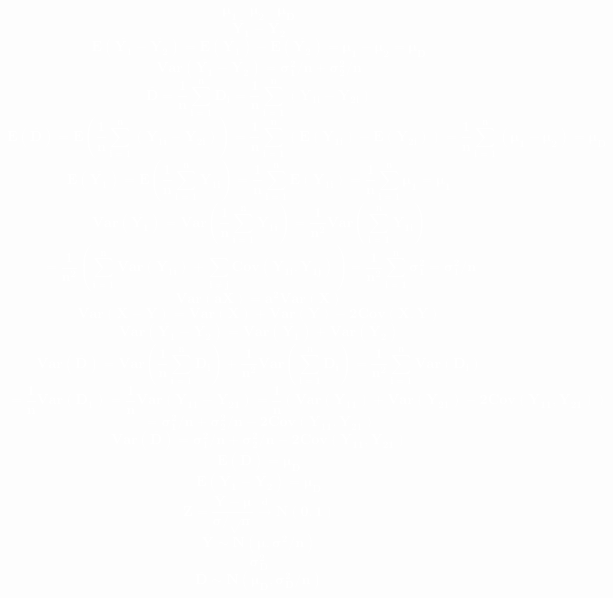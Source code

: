 \documentclass[12pt,portrait,semhelv,semrot]{article}
\begin{document}
\normalsize

\textcolor{white}{\textbf{
$$\boldsymbol{\mu_1~~~~\mu_2~~~~\mu_D}$$
$$\boldsymbol{\bar{Y_1}-\bar{Y_2}}$$
$$\boldsymbol{E\left(\bar{Y_1}-\bar{Y_2}\right)= E\left(\bar{Y_1}\right) - E\left(\bar{Y_2}\right) = \mu_1-\mu_2 = \mu_D}$$
$$\boldsymbol{Var\left(\bar{Y_1}-\bar{Y_2}\right)= \sigma_1^2/n+\sigma^2_2/n}$$
$$\boldsymbol{\bar{D} = \frac{1}{n}\sum_{i=1}^{n}D_i = \frac{1}{n}\sum_{i=1}^{n}(Y_{1i}-Y_{2i})}$$ 
$$\boldsymbol{E\left(\bar{D}\right) = E\left(\frac{1}{n}\sum_{i=1}^{n}(Y_{1i}-Y_{2i})\right) = \frac{1}{n}\sum_{i=1}^{n}\left(E\left(Y_{1i}\right)-E\left(Y_{2i}\right)\right) = \frac{1}{n}\sum_{i=1}^{n}(\mu_1-\mu_2) = \mu_D}$$
$$\boldsymbol{E\left(\bar{Y_1}\right) = E\left(\frac{1}{n}\sum_{i=1}^{n}Y_{1i}\right) = \frac{1}{n}\sum_{i=1}^{n}E(Y_{1i}) = \frac{1}{n}\sum_{i=1}^{n}\mu_1 = \mu_1}$$
$$\boldsymbol{Var\left(\bar{Y_1}\right) = Var\left(\frac{1}{n}\sum_{i=1}^{n}Y_{1i}\right) = \frac{1}{n^2}Var\left(\sum_{i=1}^{n}Y_{1i}\right)}$$
$$\boldsymbol{= \frac{1}{n^2}\left(\sum_{i=1}^{n}Var(Y_{1i}) + \sum_{i\neq j} Cov(Y_{1i}, Y_{1j})\right) = \frac{1}{n^2}\sum_{i=1}^{n}\sigma_1^2 = \sigma_1^2/n}$$
$$\boldsymbol{Var(aX) = a^2 Var(X)}$$
$$\boldsymbol{Var(X-Y) = Var(X) + Var(Y) -2Cov(X,Y)}$$
$$\boldsymbol{Var\left(\bar{Y_1}-\bar{Y_2}\right) = Var\left(\bar{Y_1}\right) + Var\left(\bar{Y}_2\right)}$$
$$\boldsymbol{Var\left(\bar{D}\right) = Var\left(\frac{1}{n}\sum_{i=1}^{n}D_i\right) + \frac{1}{n^2}Var\left(\sum_{i=1}^{n}D_i\right)= \frac{1}{n^2}\sum_{i=1}^{n}Var(D_i)}$$
$$\boldsymbol{ = \frac{1}{n}Var(D_1) = \frac{1}{n}Var(Y_{11}-Y_{21}) = \frac{1}{n}\left(Var(Y_{11})+Var(Y_{21}) -2Cov(Y_{11}, Y_{21})\right)}$$
$$\boldsymbol{ = \sigma^2_1/n+\sigma^2_2/n-2Cov(Y_{11},Y_{21})}$$
$$\boldsymbol{Var\left(\bar{D}\right) = \sigma^2_1/n+\sigma^2_2/n-2Cov(Y_{11},Y_{21})}$$
$$\boldsymbol{E\left(\bar{D}\right) = \mu_D}$$
$$\boldsymbol{E\left(\bar{Y_1}-\bar{Y_2}\right) = \mu_D}$$
$$\boldsymbol{Z = \frac{\bar{Y}-\mu}{\sigma/\sqrt{n}}\stackrel{d}\rightarrow N(0, 1)}$$
$$\boldsymbol{\bar{Y}\sim N(\mu, \sigma^2/n)}$$
$$\boldsymbol{\sigma^2_D}$$
$$\boldsymbol{\bar{D}\sim N(\mu_D, \sigma_D^2/n)}$$
}}
\end{document}
